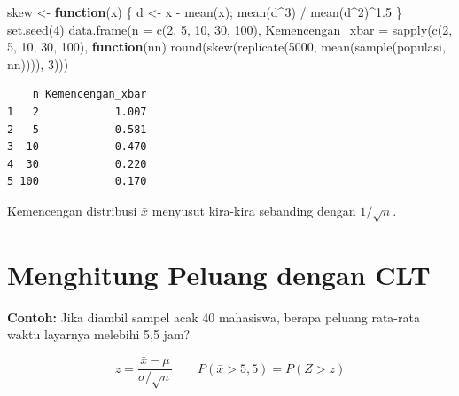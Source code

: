 \documentclass[
  indonesian,
  letterpaper,
]{book}
\newenvironment{Shaded}{\begin{snugshade}}{\end{snugshade}}
\newcommand{\AttributeTok}[1]{\textcolor[rgb]{0.40,0.45,0.13}{#1}}
\newcommand{\ControlFlowTok}[1]{\textcolor[rgb]{0.00,0.23,0.31}{\textbf{#1}}}
\newcommand{\DecValTok}[1]{\textcolor[rgb]{0.68,0.00,0.00}{#1}}
\newcommand{\FloatTok}[1]{\textcolor[rgb]{0.68,0.00,0.00}{#1}}
\newcommand{\FunctionTok}[1]{\textcolor[rgb]{0.28,0.35,0.67}{#1}}
\newcommand{\NormalTok}[1]{\textcolor[rgb]{0.00,0.23,0.31}{#1}}
\newcommand{\OtherTok}[1]{\textcolor[rgb]{0.00,0.23,0.31}{#1}}
\newcommand{\SpecialCharTok}[1]{\textcolor[rgb]{0.37,0.37,0.37}{#1}}
\begin{document}
\begin{Shaded}
\begin{Highlighting}[]
\NormalTok{skew }\OtherTok{\textless{}{-}} \ControlFlowTok{function}\NormalTok{(x) \{ d }\OtherTok{\textless{}{-}}\NormalTok{ x }\SpecialCharTok{{-}} \FunctionTok{mean}\NormalTok{(x); }\FunctionTok{mean}\NormalTok{(d}\SpecialCharTok{\^{}}\DecValTok{3}\NormalTok{) }\SpecialCharTok{/} \FunctionTok{mean}\NormalTok{(d}\SpecialCharTok{\^{}}\DecValTok{2}\NormalTok{)}\SpecialCharTok{\^{}}\FloatTok{1.5}\NormalTok{ \}}
\FunctionTok{set.seed}\NormalTok{(}\DecValTok{4}\NormalTok{)}
\FunctionTok{data.frame}\NormalTok{(}\AttributeTok{n =} \FunctionTok{c}\NormalTok{(}\DecValTok{2}\NormalTok{, }\DecValTok{5}\NormalTok{, }\DecValTok{10}\NormalTok{, }\DecValTok{30}\NormalTok{, }\DecValTok{100}\NormalTok{),}
           \AttributeTok{Kemencengan\_xbar =} \FunctionTok{sapply}\NormalTok{(}\FunctionTok{c}\NormalTok{(}\DecValTok{2}\NormalTok{, }\DecValTok{5}\NormalTok{, }\DecValTok{10}\NormalTok{, }\DecValTok{30}\NormalTok{, }\DecValTok{100}\NormalTok{), }\ControlFlowTok{function}\NormalTok{(nn)}
             \FunctionTok{round}\NormalTok{(}\FunctionTok{skew}\NormalTok{(}\FunctionTok{replicate}\NormalTok{(}\DecValTok{5000}\NormalTok{, }\FunctionTok{mean}\NormalTok{(}\FunctionTok{sample}\NormalTok{(populasi, nn)))), }\DecValTok{3}\NormalTok{)))}
\end{Highlighting}
\end{Shaded}

\begin{verbatim}
    n Kemencengan_xbar
1   2            1.007
2   5            0.581
3  10            0.470
4  30            0.220
5 100            0.170
\end{verbatim}

Kemencengan distribusi \(\bar{x}\) menyusut kira-kira sebanding dengan
\(1/\sqrt{n}\).

\section{Menghitung Peluang dengan
CLT}\label{menghitung-peluang-dengan-clt}

\textbf{Contoh:} Jika diambil sampel acak 40 mahasiswa, berapa peluang
rata-rata waktu layarnya melebihi 5,5 jam?

\[z = \frac{\bar{x} - \mu}{\sigma/\sqrt{n}} \qquad P(\bar{x} > 5{,}5) = P(Z > z)\]
\end{document}
